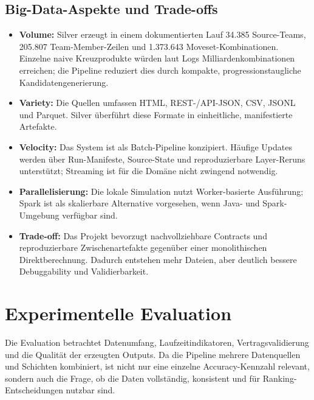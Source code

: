 \documentclass[sigconf,nonacm]{acmart}
\begin{document}
\subsection{Big-Data-Aspekte und Trade-offs}
\begin{itemize}[leftmargin=*]
  \item \textbf{Volume:} Silver erzeugt in einem dokumentierten Lauf 34.385 Source-Teams, 205.807 Team-Member-Zeilen und 1.373.643 Moveset-Kombinationen. Einzelne naive Kreuzprodukte würden laut Logs Milliardenkombinationen erreichen; die Pipeline reduziert dies durch kompakte, progressionstaugliche Kandidatengenerierung.
  \item \textbf{Variety:} Die Quellen umfassen HTML, REST-/API-JSON, CSV, JSONL und Parquet. Silver überführt diese Formate in einheitliche, manifestierte Artefakte.
  \item \textbf{Velocity:} Das System ist als Batch-Pipeline konzipiert. Häufige Updates werden über Run-Manifeste, Source-State und reproduzierbare Layer-Reruns unterstützt; Streaming ist für die Domäne nicht zwingend notwendig.
  \item \textbf{Parallelisierung:} Die lokale Simulation nutzt Worker-basierte Ausführung; Spark ist als skalierbare Alternative vorgesehen, wenn Java- und Spark-Umgebung verfügbar sind.
  \item \textbf{Trade-off:} Das Projekt bevorzugt nachvollziehbare Contracts und reproduzierbare Zwischenartefakte gegenüber einer monolithischen Direktberechnung. Dadurch entstehen mehr Dateien, aber deutlich bessere Debuggability und Validierbarkeit.
\end{itemize}

\section{Experimentelle Evaluation}
Die Evaluation betrachtet Datenumfang, Laufzeitindikatoren, Vertragsvalidierung und die Qualität der erzeugten Outputs. Da die Pipeline mehrere Datenquellen und Schichten kombiniert, ist nicht nur eine einzelne Accuracy-Kennzahl relevant, sondern auch die Frage, ob die Daten vollständig, konsistent und für Ranking-Entscheidungen nutzbar sind.
\end{document}
